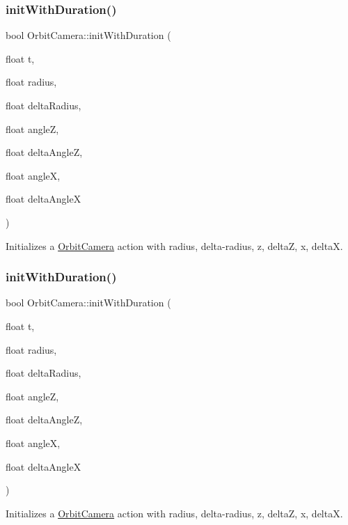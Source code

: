 \subsubsection{\texorpdfstring{init\+With\+Duration()}{initWithDuration()}\hspace{0.1cm}{\footnotesize\ttfamily [1/2]}}
{\footnotesize\ttfamily bool Orbit\+Camera\+::init\+With\+Duration (\begin{DoxyParamCaption}\item[{float}]{t,  }\item[{float}]{radius,  }\item[{float}]{delta\+Radius,  }\item[{float}]{angleZ,  }\item[{float}]{delta\+AngleZ,  }\item[{float}]{angleX,  }\item[{float}]{delta\+AngleX }\end{DoxyParamCaption})}

Initializes a \hyperlink{classOrbitCamera}{Orbit\+Camera} action with radius, delta-\/radius, z, deltaZ, x, deltaX. \mbox{\label{classOrbitCamera_a71556e8b55a1084aa656fbcd66897dc5}} 
\subsubsection{\texorpdfstring{init\+With\+Duration()}{initWithDuration()}\hspace{0.1cm}{\footnotesize\ttfamily [2/2]}}
{\footnotesize\ttfamily bool Orbit\+Camera\+::init\+With\+Duration (\begin{DoxyParamCaption}\item[{float}]{t,  }\item[{float}]{radius,  }\item[{float}]{delta\+Radius,  }\item[{float}]{angleZ,  }\item[{float}]{delta\+AngleZ,  }\item[{float}]{angleX,  }\item[{float}]{delta\+AngleX }\end{DoxyParamCaption})}

Initializes a \hyperlink{classOrbitCamera}{Orbit\+Camera} action with radius, delta-\/radius, z, deltaZ, x, deltaX. \mbox{\label{classOrbitCamera_aeed357b8f4a5a1a1a3f26142a3b7b80d}} 
